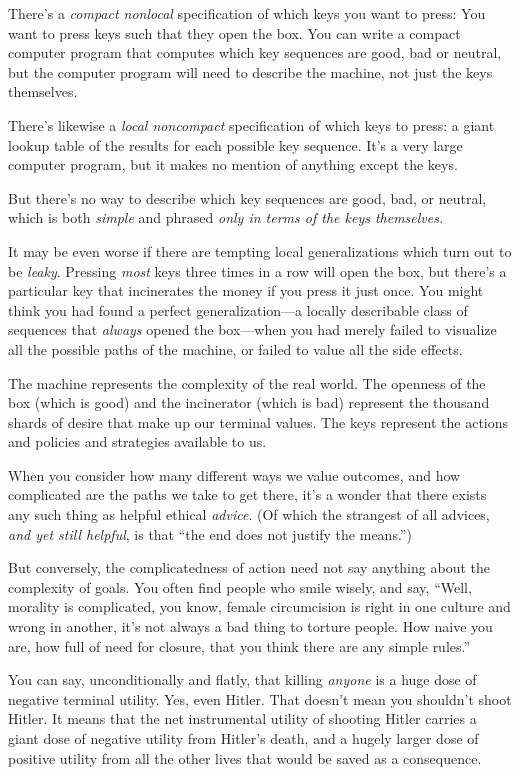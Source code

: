 {
 There's a \textit{compact nonlocal} specification
of which keys you want to press: You want to press keys such that they
open the box. You can write a compact computer program that computes
which key sequences are good, bad or neutral, but the computer program
will need to describe the machine, not just the keys themselves.}

{
 There's likewise a \textit{local noncompact}
specification of which keys to press: a giant lookup table of the
results for each possible key sequence. It's a very
large computer program, but it makes no mention of anything except the
keys.}

{
 But there's no way to describe which key sequences
are good, bad, or neutral, which is both \textit{simple} and phrased
\textit{only in terms of the keys themselves.}}

{
 It may be even worse if there are tempting local generalizations
which turn out to be \textit{leaky}. Pressing \textit{most} keys three
times in a row will open the box, but there's a
particular key that incinerates the money if you press it just once.
You might think you had found a perfect generalization---a locally
describable class of sequences that \textit{always} opened the
box---when you had merely failed to visualize all the possible paths of
the machine, or failed to value all the side effects.}

{
 The machine represents the complexity of the real world. The
openness of the box (which is good) and the incinerator (which is bad)
represent the thousand shards of desire that make up our terminal
values. The keys represent the actions and policies and strategies
available to us.}

{
 When you consider how many different ways we value outcomes, and
how complicated are the paths we take to get there,
it's a wonder that there exists any such thing as
helpful ethical \textit{advice}. (Of which the strangest of all
advices, \textit{and yet still helpful}, is that ``the
end does not justify the means.'')}

{
 But conversely, the complicatedness of action need not say
anything about the complexity of goals. You often find people who smile
wisely, and say, ``Well, morality is complicated, you
know, female circumcision is right in one culture and wrong in another,
it's not always a bad thing to torture people. How
naive you are, how full of need for closure, that you think there are
any simple rules.''}

{
 You can say, unconditionally and flatly, that killing
\textit{anyone} is a huge dose of negative terminal utility. Yes, even
Hitler. That doesn't mean you shouldn't
shoot Hitler. It means that the net instrumental utility of shooting
Hitler carries a giant dose of negative utility from
Hitler's death, and a hugely larger dose of positive
utility from all the other lives that would be saved as a consequence.}

